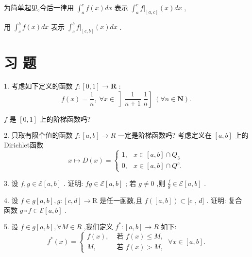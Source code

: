 为简单起见,今后一律用 ${\int }_{a}^{c}f\left( x\right) {dx}$ 表示 ${\int }_{a}^{c}f{|}_{\left\lbrack  a,c\right\rbrack  }\left( x\right) {dx}$ ,

用 ${\int }_{c}^{b}f\left( x\right) {dx}$ 表示 ${\int }_{c}^{b}f{|}_{\left\lbrack  c,b\right\rbrack  }\left( x\right) {dx}$ .

\section*{习 题}

1. 考虑如下定义的函数 $f : \left\lbrack  {0,1}\right\rbrack   \rightarrow  \mathbf{R}$ :
$$f\left( x\right)  = \frac{1}{n},\;\forall x \in  \left\rbrack  {\frac{1}{n + 1}\;\frac{1}{n}}\right\rbrack  \;\left( {\forall n \in  \mathbf{N}}\right) .$$

$f$ 是 $\left\lbrack  {0,1}\right\rbrack$ 上的阶梯函数吗?

2. 只取有限个值的函数 $f : \left\lbrack  {a,b}\right\rbrack   \rightarrow  R$ 一定是阶梯函数吗? 考虑定义在 $\left\lbrack  {a,b}\right\rbrack$ 上的Dirichlet函数
$$x \mapsto  D\left( x\right)  = \left\{  \begin{array}{ll} 1, & x \in  \left\lbrack  {a,b}\right\rbrack   \cap  {Q}_{3} \\  0, & x \in  \left\lbrack  {a,b}\right\rbrack   \cap  {Q}^{c}. \end{array}\right.$$

3. 设 $f,g \in  \mathcal{E}\left\lbrack  {a,b}\right\rbrack$ . 证明: ${fg} \in  \mathcal{E}\left\lbrack  {a,b}\right\rbrack$ ; 若 $g \neq  0$ ,则 $\frac{f}{g} \in  \mathcal{E}\left\lbrack  {a,b}\right\rbrack$ .

4. 设 $f \in  g\left\lbrack  {a,b}\right\rbrack  ,g : \left\lbrack  {c,d}\right\rbrack   \rightarrow  \mathrm{R}$ 是任一函数,且 $f\left( \left\lbrack  {a,b}\right\rbrack  \right)  \subset  \lbrack c$ , $d\rbrack$ . 证明: 复合函数 $g \circ  f \in  \mathcal{E}\left\lbrack  {a,b}\right\rbrack$ .

5. 设 $f \in  g\left\lbrack  {a,b}\right\rbrack  ,\forall M \in  R$ ,我们定义 ${f}^{ * } : \left\lbrack  {a,b}\right\rbrack   \rightarrow  R$ 如下:
$${f}^{ * }\left( x\right)  = \left\{  {\begin{array}{ll} f\left( x\right) , & \text{ 若 }f\left( x\right)  \leq  M, \\  M, & \text{ 若 }f\left( x\right)  > M, \end{array}\;\forall x \in  \left\lbrack  {a,b}\right\rbrack  .}\right.$$

